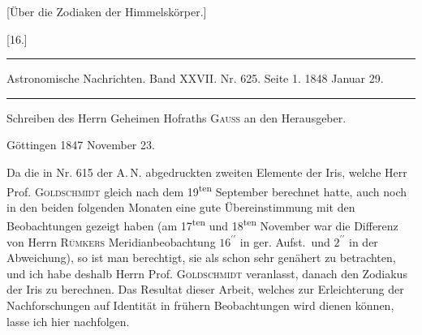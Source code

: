 \begin{center}
[Über die Zodiaken der Himmelskörper.]
\end{center}

\begin{center}
[16.]
\end{center}

\par\noindent\rule{\textwidth}{.3pt}\par

\noindent\small Astronomische Nachrichten. Band XXVII. Nr. 625. Seite 1. 1848 Januar 29.\normalsize

\par\noindent\rule{\textwidth}{.3pt}\par

\begin{center}
Schreiben des Herrn Geheimen Hofraths \textsc{Gauss} an den Herausgeber.

Göttingen 1847 November 23.
\end{center}

Da die in Nr. 615 der A.\,N. abgedruckten zweiten Elemente der Iris, welche Herr Prof. \textsc{Goldschmidt} gleich nach dem 19\textsuperscript{ten} September berechnet hatte, auch noch in den beiden folgenden Monaten eine gute Übereinstimmung mit den Beobachtungen gezeigt haben (am 17\textsuperscript{ten} und 18\textsuperscript{ten} November war die Differenz von Herrn \textsc{Rümkers} Meridianbeobachtung \(16^{\prime\prime}\) in ger. Aufst.\ und \(2^{\prime\prime}\) in der Abweichung), so ist man berechtigt, sie als schon sehr genähert zu betrachten, und ich habe deshalb Herrn Prof. \textsc{Goldschmidt} veranlasst, danach den Zodiakus der Iris zu berechnen. Das Resultat dieser Arbeit, welches zur Erleichterung der Nachforschungen auf Identität in frühern Beobachtungen wird dienen können, lasse ich hier nachfolgen.


